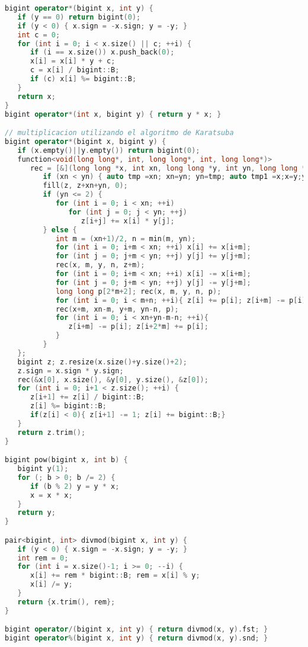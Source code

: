 \begin{lstlisting}[language=C++]
bigint operator*(bigint x, int y) {
   if (y == 0) return bigint(0);
   if (y < 0) { x.sign = -x.sign; y = -y; }
   int c = 0;
   for (int i = 0; i < x.size() || c; ++i) {
      if (i == x.size()) x.push_back(0);
      x[i] = x[i] * y + c;
      c = x[i] / bigint::B;
      if (c) x[i] %= bigint::B;
   }
   return x;
}
bigint operator*(int x, bigint y) { return y * x; }

// multiplicacion utilizando el algoritmo de Karatsuba 
bigint operator*(bigint x, bigint y) {
   if (x.empty()||y.empty()) return bigint(0);
   function<void(long long*, int, long long*, int, long long*)>
      rec = [&](long long *x, int xn, long long *y, int yn, long long *z) {
         if (xn < yn) { auto tmp =xn; xn=yn; yn=tmp; auto tmp1 =x;x=y;y=tmp1;}
         fill(z, z+xn+yn, 0);
         if (yn <= 2) {
            for (int i = 0; i < xn; ++i)
               for (int j = 0; j < yn; ++j)
                  z[i+j] += x[i] * y[j];
         } else {
            int m = (xn+1)/2, n = min(m, yn);
            for (int i = 0; i+m < xn; ++i) x[i] += x[i+m];
            for (int j = 0; j+m < yn; ++j) y[j] += y[j+m];
            rec(x, m, y, n, z+m);
            for (int i = 0; i+m < xn; ++i) x[i] -= x[i+m];
            for (int j = 0; j+m < yn; ++j) y[j] -= y[j+m];
            long long p[2*m+2]; rec(x, m, y, n, p);
            for (int i = 0; i < m+n; ++i){ z[i] += p[i]; z[i+m] -= p[i]; }
            rec(x+m, xn-m, y+m, yn-n, p);
            for (int i = 0; i < xn+yn-m-n; ++i){ 
               z[i+m] -= p[i]; z[i+2*m] += p[i];
            }
         }
   };
   bigint z; z.resize(x.size()+y.size()+2);
   z.sign = x.sign * y.sign;
   rec(&x[0], x.size(), &y[0], y.size(), &z[0]);
   for (int i = 0; i+1 < z.size(); ++i) {
      z[i+1] += z[i] / bigint::B;
      z[i] %= bigint::B;
      if(z[i] < 0){ z[i+1] -= 1; z[i] += bigint::B;}
   }
   return z.trim();
}

bigint pow(bigint x, int b) {
   bigint y(1);
   for (; b > 0; b /= 2) {
      if (b % 2) y = y * x;
      x = x * x;
   }
   return y;
}

pair<bigint, int> divmod(bigint x, int y) {
   if (y < 0) { x.sign = -x.sign; y = -y; }
   int rem = 0;
   for (int i = x.size()-1; i >= 0; --i) {
      x[i] += rem * bigint::B; rem = x[i] % y;
      x[i] /= y;
   }
   return {x.trim(), rem};
}

bigint operator/(bigint x, int y) { return divmod(x, y).fst; }
bigint operator%(bigint x, int y) { return divmod(x, y).snd; }


\end{lstlisting}
